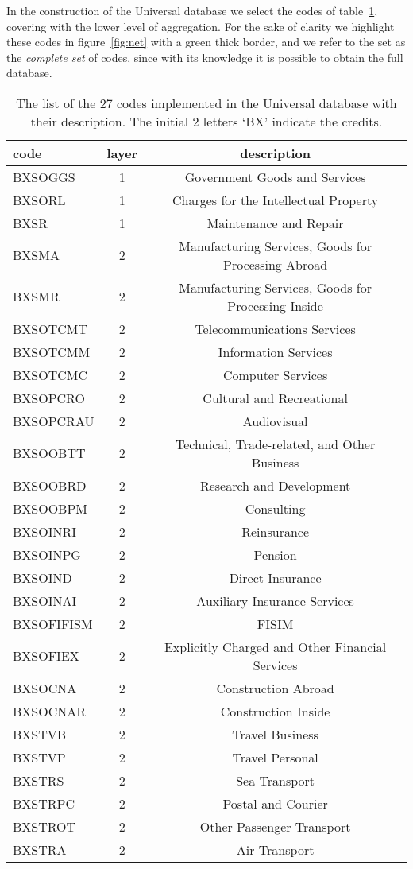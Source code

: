 \documentclass[fleqn,10pt]{article}
\begin{document}
In the construction of the Universal database we select the codes of table~\ref{tab:complete_set}, covering with the lower level of aggregation.
For the sake of clarity we highlight these codes in figure~\ref{fig:net}  with a green thick border, and we refer to the set as the \textit{complete set} of codes, since with its knowledge it is possible to obtain the full database.
\begin{table}[h!]
	\centering
	\small
	\begin{tabular}{| l | c | c |}
		\hline
		\textbf{code} & \textbf{layer} & \textbf{description}\\
		\hline
		BXSOGGS & 1 & Government Goods and Services \\
		BXSORL & 1 & Charges for the Intellectual Property \\
		BXSR & 1 & Maintenance and Repair \\
		\hline
		BXSMA & 2 & Manufacturing Services, Goods for Processing Abroad \\
		BXSMR & 2 & Manufacturing Services, Goods for Processing Inside \\
		BXSOTCMT & 2 & Telecommunications Services \\
		BXSOTCMM & 2 & Information Services \\
		BXSOTCMC & 2 & Computer Services \\
		BXSOPCRO & 2 & Cultural and Recreational \\
		BXSOPCRAU & 2 & Audiovisual \\
		BXSOOBTT & 2 & Technical, Trade-related, and Other Business \\
		BXSOOBRD & 2 & Research and Development \\
		BXSOOBPM & 2 & Consulting \\
		BXSOINRI & 2 & Reinsurance \\
		BXSOINPG & 2 & Pension \\
		BXSOIND & 2 & Direct Insurance \\
		BXSOINAI & 2 & Auxiliary Insurance Services \\
		BXSOFIFISM & 2 & FISIM \\
		BXSOFIEX & 2 & Explicitly Charged and Other Financial Services \\
		BXSOCNA & 2 & Construction Abroad \\
		BXSOCNAR & 2 & Construction Inside \\
		BXSTVB & 2 & Travel Business \\
		BXSTVP & 2 & Travel Personal \\
		BXSTRS & 2 & Sea Transport \\
		BXSTRPC & 2 & Postal and Courier \\
		BXSTROT & 2 & Other Passenger Transport \\
		BXSTRA & 2 & Air Transport \\
		\hline
	\end{tabular}
	\caption{The list of the 27 codes implemented in the Universal database with their description. The initial 2 letters `BX' indicate the credits.}
	\label{tab:complete_set}
\end{table}
\end{document}
